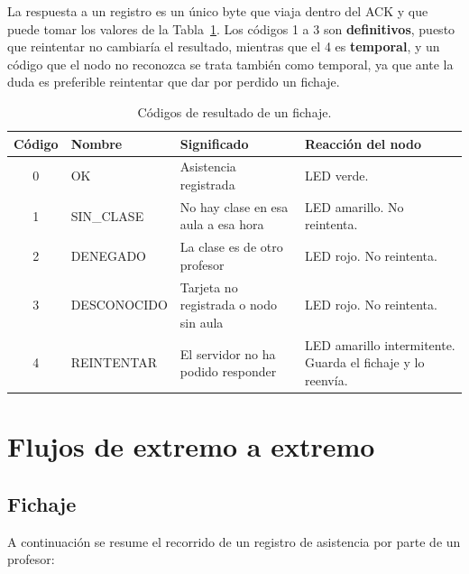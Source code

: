 La respuesta a un registro es un único byte que viaja dentro del ACK y que puede tomar los valores de la Tabla~\ref{tab:codigos}. Los códigos 1 a 3 son \textbf{definitivos}, puesto que reintentar no cambiaría el resultado, mientras que el 4 es \textbf{temporal}, y un código que el nodo no reconozca se trata también como temporal, ya que ante la duda es preferible reintentar que dar por perdido un fichaje.

\begin{table}[H]
\centering
\small
\caption{\label{tab:codigos} Códigos de resultado de un fichaje.}
\begin{tabular}{|c|l|p{4.3cm}|p{5cm}|}
\hline
\textbf{Código} & \textbf{Nombre} & \textbf{Significado} & \textbf{Reacción del nodo} \\
\hline
0 & OK & Asistencia registrada & LED verde. \\
\hline
1 & SIN\_CLASE & No hay clase en esa aula a esa hora & LED amarillo. No reintenta. \\
\hline
2 & DENEGADO & La clase es de otro profesor & LED rojo. No reintenta. \\
\hline
3 & DESCONOCIDO & Tarjeta no registrada o nodo sin aula & LED rojo. No reintenta. \\
\hline
4 & REINTENTAR & El servidor no ha podido responder & LED amarillo intermitente. Guarda el fichaje y lo reenvía. \\
\hline
\end{tabular}
\end{table}

\section{Flujos de extremo a extremo}

\subsection{Fichaje}

A continuación se resume el recorrido de un registro de asistencia por parte de un profesor:

